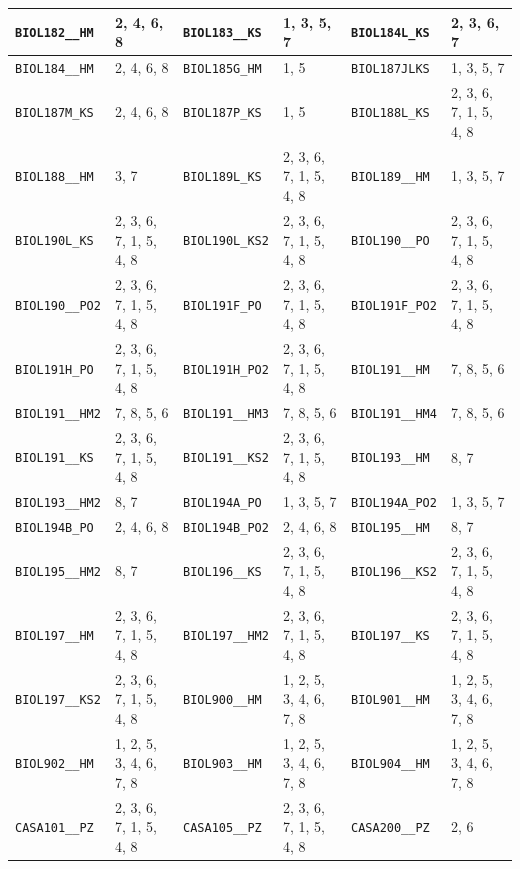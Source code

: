 \begin{longtable}{|l|l||l|l||l|l|}
    \verb|BIOL182__HM| & 2, 4, 6, 8 & \verb|BIOL183__KS| & 1, 3, 5, 7 & \verb|BIOL184L_KS| & 2, 3, 6, 7\\\hline
    \verb|BIOL184__HM| & 2, 4, 6, 8 & \verb|BIOL185G_HM| & 1, 5 & \verb|BIOL187JLKS| & 1, 3, 5, 7\\\hline
    \verb|BIOL187M_KS| & 2, 4, 6, 8 & \verb|BIOL187P_KS| & 1, 5 & \verb|BIOL188L_KS| & 2, 3, 6, 7, 1, 5, 4, 8\\\hline
    \verb|BIOL188__HM| & 3, 7 & \verb|BIOL189L_KS| & 2, 3, 6, 7, 1, 5, 4, 8 & \verb|BIOL189__HM| & 1, 3, 5, 7\\\hline
    \verb|BIOL190L_KS| & 2, 3, 6, 7, 1, 5, 4, 8 & \verb|BIOL190L_KS2| & 2, 3, 6, 7, 1, 5, 4, 8 & \verb|BIOL190__PO| & 2, 3, 6, 7, 1, 5, 4, 8\\\hline
    \verb|BIOL190__PO2| & 2, 3, 6, 7, 1, 5, 4, 8 & \verb|BIOL191F_PO| & 2, 3, 6, 7, 1, 5, 4, 8 & \verb|BIOL191F_PO2| & 2, 3, 6, 7, 1, 5, 4, 8\\\hline
    \verb|BIOL191H_PO| & 2, 3, 6, 7, 1, 5, 4, 8 & \verb|BIOL191H_PO2| & 2, 3, 6, 7, 1, 5, 4, 8 & \verb|BIOL191__HM| & 7, 8, 5, 6\\\hline
    \verb|BIOL191__HM2| & 7, 8, 5, 6 & \verb|BIOL191__HM3| & 7, 8, 5, 6 & \verb|BIOL191__HM4| & 7, 8, 5, 6\\\hline
    \verb|BIOL191__KS| & 2, 3, 6, 7, 1, 5, 4, 8 & \verb|BIOL191__KS2| & 2, 3, 6, 7, 1, 5, 4, 8 & \verb|BIOL193__HM| & 8, 7\\\hline
    \verb|BIOL193__HM2| & 8, 7 & \verb|BIOL194A_PO| & 1, 3, 5, 7 & \verb|BIOL194A_PO2| & 1, 3, 5, 7\\\hline
    \verb|BIOL194B_PO| & 2, 4, 6, 8 & \verb|BIOL194B_PO2| & 2, 4, 6, 8 & \verb|BIOL195__HM| & 8, 7\\\hline
    \verb|BIOL195__HM2| & 8, 7 & \verb|BIOL196__KS| & 2, 3, 6, 7, 1, 5, 4, 8 & \verb|BIOL196__KS2| & 2, 3, 6, 7, 1, 5, 4, 8\\\hline
    \verb|BIOL197__HM| & 2, 3, 6, 7, 1, 5, 4, 8 & \verb|BIOL197__HM2| & 2, 3, 6, 7, 1, 5, 4, 8 & \verb|BIOL197__KS| & 2, 3, 6, 7, 1, 5, 4, 8\\\hline
    \verb|BIOL197__KS2| & 2, 3, 6, 7, 1, 5, 4, 8 & \verb|BIOL900__HM| & 1, 2, 5, 3, 4, 6, 7, 8 & \verb|BIOL901__HM| & 1, 2, 5, 3, 4, 6, 7, 8\\\hline
    \verb|BIOL902__HM| & 1, 2, 5, 3, 4, 6, 7, 8 & \verb|BIOL903__HM| & 1, 2, 5, 3, 4, 6, 7, 8 & \verb|BIOL904__HM| & 1, 2, 5, 3, 4, 6, 7, 8\\\hline
    \verb|CASA101__PZ| & 2, 3, 6, 7, 1, 5, 4, 8 & \verb|CASA105__PZ| & 2, 3, 6, 7, 1, 5, 4, 8 & \verb|CASA200__PZ| & 2, 6\\\hline

\end{longtable}
